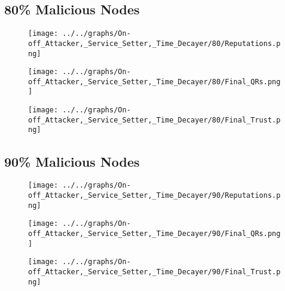 \begin{minipage}[t]{0.49\columnwidth}
\subsection*{80\% Malicious Nodes}
    \begin{figure}[H]
        \centering
        \texttt{[image: ../../graphs/On-off\_Attacker,\_Service\_Setter,\_Time\_Decayer/80/Reputations.png]}
    \end{figure}
    \begin{figure}[H]
        \centering
        \texttt{[image: ../../graphs/On-off\_Attacker,\_Service\_Setter,\_Time\_Decayer/80/Final\_QRs.png]}
    \end{figure}
\end{minipage}
\begin{minipage}[t]{0.49\columnwidth}
    \begin{figure}[H]
        \centering
        \texttt{[image: ../../graphs/On-off\_Attacker,\_Service\_Setter,\_Time\_Decayer/80/Final\_Trust.png]}
    \end{figure}
\end{minipage}

\begin{minipage}[t]{0.49\columnwidth}
\subsection*{90\% Malicious Nodes}
    \begin{figure}[H]
        \centering
        \texttt{[image: ../../graphs/On-off\_Attacker,\_Service\_Setter,\_Time\_Decayer/90/Reputations.png]}
    \end{figure}
    \begin{figure}[H]
        \centering
        \texttt{[image: ../../graphs/On-off\_Attacker,\_Service\_Setter,\_Time\_Decayer/90/Final\_QRs.png]}
    \end{figure}
\end{minipage}
\begin{minipage}[t]{0.49\columnwidth}
    \begin{figure}[H]
        \centering
        \texttt{[image: ../../graphs/On-off\_Attacker,\_Service\_Setter,\_Time\_Decayer/90/Final\_Trust.png]}
    \end{figure}
\end{minipage}
\newpage

